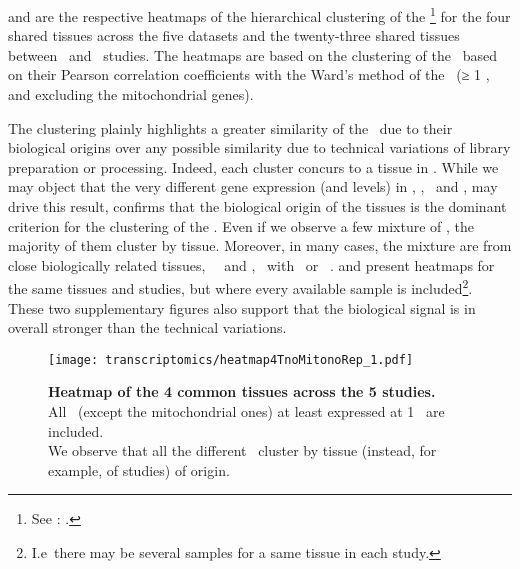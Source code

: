  and 
are the respective heatmaps of the hierarchical clustering
of the \treps{}\footnote{See :
.}
for the four shared tissues across the five datasets and the
twenty-three shared tissues between \uhlen\ and \gtex\ studies.
The heatmaps are based on the clustering of the \treps\ based on
their Pearson correlation coefficients with the Ward's method
of the \pcgs\ (≥ 1 \FPKM, and excluding
the mitochondrial genes).

The clustering plainly highlights a greater similarity of the \treps\
due to their biological origins over any possible
similarity due to technical variations of library preparation or processing.
Indeed, each cluster concurs to a tissue in \Cref{fig:noMitoNoRep4T}.
While we may object that
the very different gene expression (and levels) in
\Heart, \Kidney, \Liver\ and \Testis,
may drive this result,
 confirms that the biological origin of the tissues
is the dominant criterion for the clustering of the \treps.
Even if we observe a few mixture of \treps,
the majority of them cluster by tissue.
Moreover, in many cases, the mixture are from close biologically related tissues,
\eg\ \fallopian\ and \Ovary, \salivary\
with \Esophagus\ or \Stomach\ \treps.
\Cref{fig:noMitoRep4T} and 
present heatmaps for the same tissues and studies,
but where every available sample is included\footnote{I.e\
there may be several samples for a same tissue in each study.}.
These two supplementary figures also support that
the biological signal is in overall stronger than the technical variations.

\begin{figure}[!htpb]
    \texttt{[image: transcriptomics/heatmap4TnoMitonoRep\_1.pdf]}\centering
    \caption[Heatmap of the 4 common tissues across the 5 studies]%
    {\label{fig:noMitoNoRep4T}\textbf{Heatmap of the 4 common tissues
    across the 5 studies.}\\All \pcgs\ (except the mitochondrial
    ones) at least expressed at 1 \FPKM\ are included.\\We observe that all the
    different \treps\ cluster by tissue (instead, for example, of studies)
    of origin.}
\end{figure}

